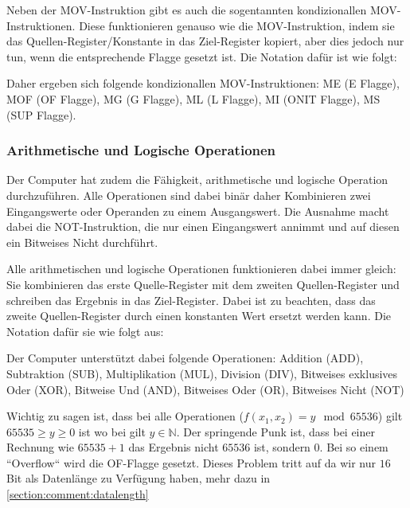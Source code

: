 \documentclass{scrartcl}
\begin{document}
Neben der MOV-Instruktion gibt es auch die sogentannten kondizionallen MOV-Instruktionen. Diese funktionieren genauso wie die MOV-Instruktion, indem sie das Quellen-Register/Konstante in das Ziel-Register kopiert, aber dies jedoch nur tun, wenn die entsprechende Flagge gesetzt ist. Die Notation dafür ist wie folgt:


Daher ergeben sich folgende kondizionallen MOV-Instruktionen: ME (E Flagge), MOF (OF Flagge), MG (G Flagge), ML (L Flagge), MI (ONIT Flagge), MS (SUP Flagge).



\subsubsection{\label{section:arthimatik}Arithmetische und Logische Operationen}

Der Computer hat zudem die Fähigkeit, arithmetische und logische Operation durchzuführen. Alle Operationen sind dabei binär daher Kombinieren zwei Eingangswerte oder Operanden zu einem Ausgangswert. Die Ausnahme macht dabei die NOT-Instruktion, die nur einen Eingangswert annimmt und auf diesen ein Bitweises Nicht durchführt. 

Alle arithmetischen und logische Operationen funktionieren dabei immer gleich: Sie kombinieren das erste Quelle-Register mit dem zweiten Quellen-Register und schreiben das Ergebnis in das Ziel-Register. Dabei ist zu beachten, dass das zweite Quellen-Register durch einen konstanten Wert ersetzt werden kann. Die Notation dafür sie wie folgt aus:


Der Computer unterstützt dabei folgende Operationen: Addition (ADD), Subtraktion (SUB), Multiplikation (MUL), Division (DIV), Bitweises exklusives Oder (XOR), Bitweise Und (AND), Bitweises Oder (OR), Bitweises Nicht (NOT)



Wichtig zu sagen ist, dass bei alle Operationen ($f(x_1, x_2) = y \mod 65536$) gilt $65535 \ge y \ge 0$ ist wo bei gilt $y \in \mathbb{N}$. Der springende Punk ist, dass bei einer Rechnung wie $65535 + 1$ das Ergebnis nicht $65536$ ist, sondern $0$. Bei so einem “Overflow“ wird die OF-Flagge gesetzt. Dieses Problem tritt auf da wir nur $16$ Bit als Datenlänge zu Verfügung haben, mehr dazu in \autoref{section:comment:datalength}
\end{document}
